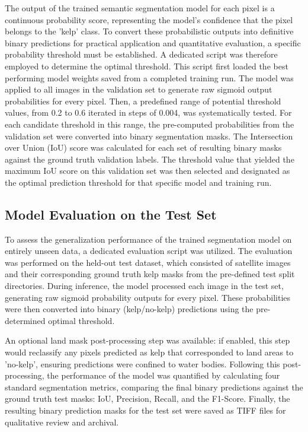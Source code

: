 \documentclass{article}
\begin{document}
The output of the trained semantic segmentation model for each pixel is a continuous probability score, representing the model's confidence that the pixel belongs to the 'kelp' class. To convert these probabilistic outputs into definitive binary predictions for practical application and quantitative evaluation, a specific probability threshold must be established. A dedicated script was therefore employed to determine the optimal threshold. This script first loaded the best performing model weights saved from a completed training run. The model was applied to all images in the validation set to generate raw sigmoid output probabilities for every pixel. Then, a predefined range of potential threshold values, from 0.2 to 0.6 iterated in steps of 0.004, was systematically tested. For each candidate threshold in this range, the pre-computed probabilities from the validation set were converted into binary segmentation masks. The Intersection over Union (IoU) score was calculated for each set of resulting binary masks against the ground truth validation labels. The threshold value that yielded the maximum IoU score on this validation set was then selected and designated as the optimal prediction threshold for that specific model and training run.

\subsection{Model Evaluation on the Test Set}

To assess the generalization performance of the trained segmentation model on entirely unseen data, a dedicated evaluation script was utilized. The evaluation was performed on the held-out test dataset, which consisted of satellite images and their corresponding ground truth kelp masks from the pre-defined test split directories. During inference, the model processed each image in the test set, generating raw sigmoid probability outputs for every pixel. These probabilities were then converted into binary (kelp/no-kelp) predictions using the pre-determined optimal threshold. 

An optional land mask post-processing step was available: if enabled, this step would reclassify any pixels predicted as kelp that corresponded to land areas to 'no-kelp', ensuring predictions were confined to water bodies. Following this post-processing, the performance of the model was quantified by calculating four standard segmentation metrics, comparing the final binary predictions against the ground truth test masks: IoU, Precision, Recall, and the F1-Score. Finally, the resulting binary prediction masks for the test set were saved as TIFF files for qualitative review and archival.
\end{document}
